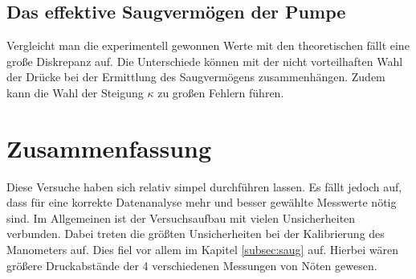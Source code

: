 \documentclass[a4paper,usenatbib]{aspdoc}
\begin{document}
        \subsection{Das effektive Saugvermögen der Pumpe}
            Vergleicht man die experimentell gewonnen Werte mit den theoretischen fällt eine große Diskrepanz auf. Die Unterschiede können mit der nicht vorteilhaften Wahl der Drücke bei der Ermittlung des Saugvermögens zusammenhängen. Zudem kann die Wahl der Steigung $\kappa$ zu großen Fehlern führen.
            
    
    \section{Zusammenfassung}\label{sec:conclusion}
            Diese Versuche haben sich relativ simpel durchführen lassen. Es fällt jedoch auf, dass für eine korrekte Datenanalyse mehr und besser gewählte Messwerte nötig sind. Im Allgemeinen ist der Versuchsaufbau mit vielen Unsicherheiten verbunden. Dabei treten die größten Unsicherheiten bei der Kalibrierung des Manometers auf. Dies fiel vor allem im Kapitel \ref{subsec:saug} auf. Hierbei wären größere Druckabstände der 4 verschiedenen Messungen von Nöten gewesen.
        
        
        
    
    
    


    \appendix
\end{document}
